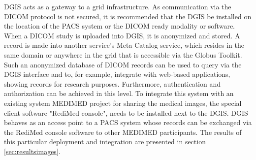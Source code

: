 DGIS acts as a gateway to a grid infrastructure. As communication via the DICOM protocol is not secured, it is recommended that the DGIS be installed on the location of the PACS system or the DICOM ready modality or software. When a DICOM study is uploaded into DGIS, it is anonymized and stored. A record is made into another service’s Meta Catalog service, which resides in the same domain or anywhere in the grid that is accessible via the Globus Toolkit. Such an anonymized database of DICOM records can be used to query via the DGIS interface and to, for example, integrate with web-based applications, showing records for research purposes. Furthermore, authentication and authorization can be achieved in this level. 
To integrate this system with an existing system MEDIMED project \cite{Slavicek2010} for sharing the medical images, the special client software "RediMed console", needs to be installed next to the DGIS. DGIS behaves as an access point to a PACS system whose records can be exchanged via the RediMed console software to other MEDIMED participants. 
The results of this particular deployment and integration are presented in section \ref{sec:resultsimages}.






